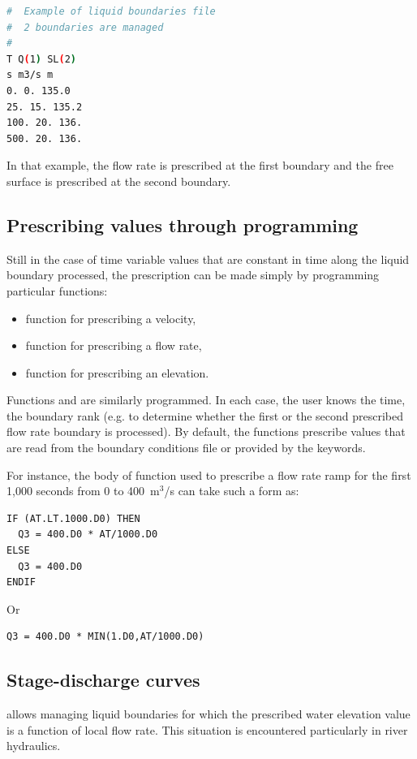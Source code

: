 \begin{lstlisting}[language=bash]
#  Example of liquid boundaries file
#  2 boundaries are managed
#
T Q(1) SL(2)
s m3/s m
0. 0. 135.0
25. 15. 135.2
100. 20. 136.
500. 20. 136.
\end{lstlisting}

In that example, the flow rate is prescribed at the first boundary and the free
surface is prescribed at the second boundary.


\subsection{Prescribing values through programming}

Still in the case of time variable values that are constant in time along the
liquid boundary processed, the prescription can be made simply by programming
particular functions:

\begin{itemize}
\item {} function for prescribing a velocity,

\item {} function for prescribing a flow rate,

\item {} function for prescribing an elevation.
\end{itemize}

Functions  and  are similarly programmed.
In each case, the user knows the time, the boundary rank (e.g. to determine
whether the first or the second prescribed flow rate boundary is processed).
By default, the functions prescribe values that are read from the boundary
conditions file or provided by the keywords.

For instance, the body of function  used to prescribe a flow rate
ramp for the first 1,000 seconds from 0 to 400~m${}^{3}$/s can take such a form as:

\begin{lstlisting}[language=TelFortran]
IF (AT.LT.1000.D0) THEN
  Q3 = 400.D0 * AT/1000.D0
ELSE
  Q3 = 400.D0
ENDIF
\end{lstlisting}

Or

\begin{lstlisting}[language=TelFortran]
Q3 = 400.D0 * MIN(1.D0,AT/1000.D0)
\end{lstlisting}

\subsection{Stage-discharge curves}
\label{sec:discharge}
 allows managing liquid boundaries for which the prescribed water
elevation value is a function of local flow rate. This situation is encountered
particularly in river hydraulics.

